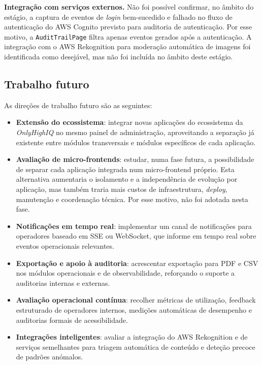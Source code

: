 \textbf{Integração com serviços externos.} Não foi possível confirmar, no âmbito do estágio, a captura de eventos de \textit{login} bem-sucedido e falhado no fluxo de autenticação do AWS Cognito previsto para auditoria de autenticação. Por esse motivo, a \texttt{AuditTrailPage} filtra apenas eventos gerados após a autenticação. A integração com o AWS Rekognition para moderação automática de imagens foi identificada como desejável, mas não foi incluída no âmbito deste estágio.

\subsection{Trabalho futuro}
\label{subsec:trabalho_futuro}

As direções de trabalho futuro são as seguintes:

\begin{itemize}
  \item \textbf{Extensão do ecossistema}: integrar novas aplicações do ecossistema da \textit{OnlyHighIQ} no mesmo painel de administração, aproveitando a separação já existente entre módulos transversais e módulos específicos de cada aplicação.

  \item \textbf{Avaliação de micro-frontends}: estudar, numa fase futura, a possibilidade de separar cada aplicação integrada num micro-frontend próprio. Esta alternativa aumentaria o isolamento e a independência de evolução por aplicação, mas também traria mais custos de infraestrutura, \textit{deploy}, manutenção e coordenação técnica. Por esse motivo, não foi adotada nesta fase.

  \item \textbf{Notificações em tempo real}: implementar um canal de notificações para operadores baseado em \gls{SSE} ou WebSocket, que informe em tempo real sobre eventos operacionais relevantes.

  \item \textbf{Exportação e apoio à auditoria}: acrescentar exportação para \gls{PDF} e \gls{CSV} nos módulos operacionais e de observabilidade, reforçando o suporte a auditorias internas e externas.

  \item \textbf{Avaliação operacional contínua}: recolher métricas de utilização, feedback estruturado de operadores internos, medições automáticas de desempenho e auditorias formais de acessibilidade.

  \item \textbf{Integrações inteligentes}: avaliar a integração do AWS Rekognition e de serviços semelhantes para triagem automática de conteúdo e deteção precoce de padrões anómalos.
\end{itemize}

